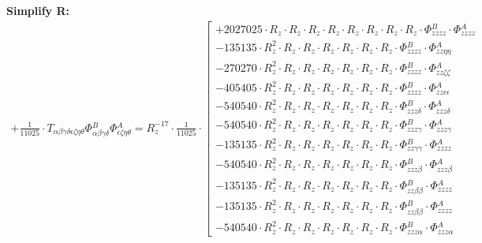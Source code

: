 \documentclass{article}
\begin{document}
\textbf{Simplify R:}
\begin{subequations}\begin{gather}
+ \frac{1}{11025} \cdot T_{\alpha{}\beta{}\gamma{}\delta{}\epsilon{}\zeta{}\eta{}\theta{}} \Phi{}^{B}_{\alpha{}\beta{}\gamma{}\delta{}} \Phi{}^{A}_{\epsilon{}\zeta{}\eta{}\theta{}} = R_{z}^{-17} \cdot \frac{1}{11025} \cdot  \left[ \begin{array}{c} 
 		+ 2027025 \cdot R_{z} \cdot R_{z} \cdot R_{z} \cdot R_{z} \cdot R_{z} \cdot R_{z} \cdot R_{z} \cdot R_{z} \cdot \Phi{}^{B}_{zzzz} \cdot \Phi{}^{A}_{zzzz} 
 \\[0.2em] 		 - 135135 \cdot R_{z}^{2} \cdot R_{z} \cdot R_{z} \cdot R_{z} \cdot R_{z} \cdot R_{z} \cdot R_{z} \cdot \Phi{}^{B}_{zzzz} \cdot \Phi{}^{A}_{zz\eta{}\eta{}} 
 \\[0.2em] 		 - 270270 \cdot R_{z}^{2} \cdot R_{z} \cdot R_{z} \cdot R_{z} \cdot R_{z} \cdot R_{z} \cdot R_{z} \cdot \Phi{}^{B}_{zzzz} \cdot \Phi{}^{A}_{zz\zeta{}\zeta{}} 
 \\[0.2em] 		 - 405405 \cdot R_{z}^{2} \cdot R_{z} \cdot R_{z} \cdot R_{z} \cdot R_{z} \cdot R_{z} \cdot R_{z} \cdot \Phi{}^{B}_{zzzz} \cdot \Phi{}^{A}_{zz\epsilon{}\epsilon{}} 
 \\[0.2em] 		 - 540540 \cdot R_{z}^{2} \cdot R_{z} \cdot R_{z} \cdot R_{z} \cdot R_{z} \cdot R_{z} \cdot R_{z} \cdot \Phi{}^{B}_{zzz\delta{}} \cdot \Phi{}^{A}_{zzz\delta{}} 
 \\[0.2em] 		 - 540540 \cdot R_{z}^{2} \cdot R_{z} \cdot R_{z} \cdot R_{z} \cdot R_{z} \cdot R_{z} \cdot R_{z} \cdot \Phi{}^{B}_{zzz\gamma{}} \cdot \Phi{}^{A}_{zzz\gamma{}} 
 \\[0.2em] 		 - 135135 \cdot R_{z}^{2} \cdot R_{z} \cdot R_{z} \cdot R_{z} \cdot R_{z} \cdot R_{z} \cdot R_{z} \cdot \Phi{}^{B}_{zz\gamma{}\gamma{}} \cdot \Phi{}^{A}_{zzzz} 
 \\[0.2em] 		 - 540540 \cdot R_{z}^{2} \cdot R_{z} \cdot R_{z} \cdot R_{z} \cdot R_{z} \cdot R_{z} \cdot R_{z} \cdot \Phi{}^{B}_{zzz\beta{}} \cdot \Phi{}^{A}_{zzz\beta{}} 
 \\[0.2em] 		 - 135135 \cdot R_{z}^{2} \cdot R_{z} \cdot R_{z} \cdot R_{z} \cdot R_{z} \cdot R_{z} \cdot R_{z} \cdot \Phi{}^{B}_{zz\beta{}\beta{}} \cdot \Phi{}^{A}_{zzzz} 
 \\[0.2em] 		 - 135135 \cdot R_{z}^{2} \cdot R_{z} \cdot R_{z} \cdot R_{z} \cdot R_{z} \cdot R_{z} \cdot R_{z} \cdot \Phi{}^{B}_{zz\beta{}\beta{}} \cdot \Phi{}^{A}_{zzzz} 
 \\[0.2em] 		 - 540540 \cdot R_{z}^{2} \cdot R_{z} \cdot R_{z} \cdot R_{z} \cdot R_{z} \cdot R_{z} \cdot R_{z} \cdot \Phi{}^{B}_{zzz\alpha{}} \cdot \Phi{}^{A}_{zzz\alpha{}} 

\end{array}
\end{gather}
\end{subequations}
\end{document}
